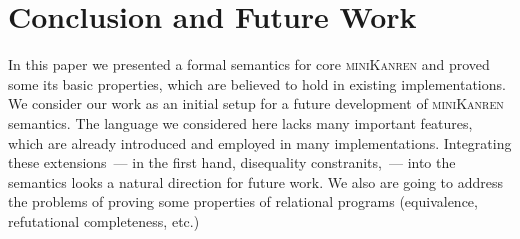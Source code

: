 \section{Conclusion and Future Work}

In this paper we presented a formal semantics for core \textsc{miniKanren} and proved some its basic properties,
which are believed to hold in existing implementations. We consider our work as an initial setup for a future development
of \textsc{miniKanren} semantics. The language we considered here lacks many important features, which are already introduced
and employed in many implementations. Integrating these extensions~--- in the first hand, disequality constranits,~--- into
the semantics looks a natural direction for future work. We also are going to address the problems of proving some
properties of relational programs (equivalence, refutational completeness, etc.)


